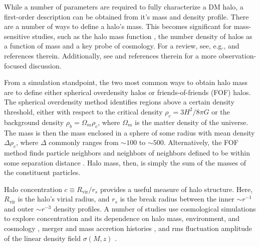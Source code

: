 
While a number of parameters are required to fully characterize a DM halo, a first-order description can be obtained from it's mass and density profile.  There are a number of ways to define a halo's mass.  This becomes significant for mass-sensitive studies, such as the halo mass function \citep{1974ApJ...187..425P, 2007MNRAS.374....2R, 2006ApJ...642L..85H, 2007ApJ...671.1160L}, the number density of halos as a function of mass and a key probe of cosmology.  For a review, see, e.g., \citet{2001A&A...367...27W} and references therein.  Additionally, see \citet{2005RvMP...77..207V} and references therein for a more observation-focused discussion.

From a simulation standpoint, the two most common ways to obtain halo mass are to define either spherical overdensity halos or friends-of-friends (FOF) halos.  The spherical overdensity method identifies regions above a certain density threshold, either with respect to the critical density $\rho_{c} = 3 H^{2} / 8 \pi G$ or the background density $\rho_{b} = \Omega_{m} \rho_{c}$, where $\Omega_{m}$ is the matter density of the universe.  The mass is then the mass enclosed in a sphere of some radius with mean density $\Delta \rho_{c}$, where $\Delta$ commonly ranges from $\sim 100$ to $\sim 500$.  Alternatively, the FOF method finds particle neighbors and neighbors of neighbors defined to be within some separation distance \citep{1984MNRAS.206..529E, 1985ApJ...292..371D}.  Halo mass, then, is simply the sum of the masses of the constituent particles.

Halo concentration $c \equiv R_{\mathrm{vir}} / r_{s}$ provides a useful measure of halo structure.  Here, $R_{\mathrm{vir}}$ is the halo's virial radius, and $r_{s}$ is the break radius between the inner $\sim r^{-1}$ and outer $\sim r^{-3}$ density profiles.  A number of studies use cosmological simulations to explore concentration and its dependence on halo mass, environment, and cosmology \citep{1997ApJ...490..493N, 2001MNRAS.321..559B, 2001ApJ...554..114E, 2007MNRAS.381.1450N, 2008MNRAS.387..536G, 2008MNRAS.391.1940M, 2011MNRAS.411..584M, 2011ApJ...740..102K}, merger and mass accretion histories \citep{2002ApJ...568...52W, 2003MNRAS.339...12Z, 2009ApJ...707..354Z}, and rms fluctuation amplitude of the linear density field $\sigma(M, z)$ \citep{2012MNRAS.423.3018P}.

